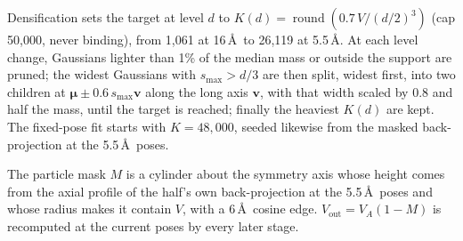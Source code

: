 Densification sets the target at level $d$ to $K(d)=\operatorname{round}(0.7\,V/(d/2)^3)$ (cap 50,000, never binding), from 1,061 at 16\,\AA\ to 26,119 at 5.5\,\AA.
At each level change, Gaussians lighter than 1\% of the median mass or outside the support are pruned; the widest Gaussians with $s_{\max}>d/3$ are then split, widest first, into two children at $\bm{\mu}\pm0.6\,s_{\max}\mathbf{v}$ along the long axis $\mathbf{v}$, with that width scaled by 0.8 and half the mass, until the target is reached; finally the heaviest $K(d)$ are kept.
The fixed-pose fit starts with $K=48{,}000$, seeded likewise from the masked back-projection at the 5.5\,\AA\ poses.

The particle mask $M$ is a cylinder about the symmetry axis whose height comes from the axial profile of the half's own back-projection at the 5.5\,\AA\ poses and whose radius makes it contain $V$, with a 6\,\AA\ cosine edge.
$V_{\mathrm{out}}=V_A(1-M)$ is recomputed at the current poses by every later stage.

